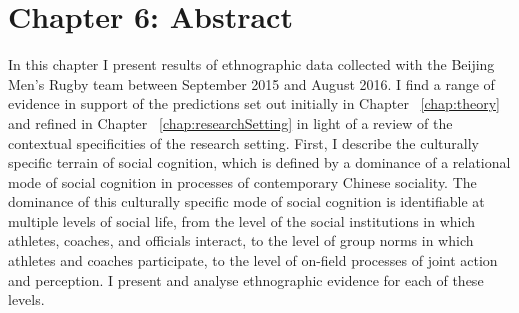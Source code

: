 \chapter*{Chapter 6: Abstract}






In this chapter I present results of ethnographic data collected with the Beijing Men's Rugby team between September 2015 and August 2016.  I find a range of evidence in support of the predictions set out initially in Chapter ~\ref{chap:theory} and refined in Chapter ~\ref{chap:researchSetting} in light of a review of the contextual specificities of the research setting.  First, I describe the culturally specific terrain of social cognition, which is defined by a dominance of a relational mode of social cognition in processes of contemporary Chinese sociality.  The dominance of this culturally specific mode of social cognition is identifiable at multiple levels of social life, from the level of the social institutions in which athletes, coaches, and officials interact, to the level of group norms in which athletes and coaches participate, to the level of on-field processes of joint action and perception.  I present and analyse ethnographic evidence for each of these levels.
